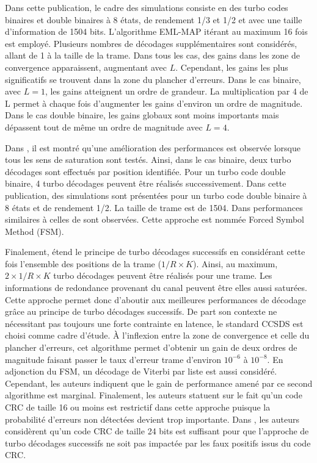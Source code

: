 Dans cette publication, le cadre des simulations consiste en des turbo codes binaires et double binaires à 8 états, de 
rendement 1/3 et 1/2 et avec une taille d'information de 1504 bits. L'algorithme EML-MAP itérant au maximum 16 fois est
employé. Plusieurs nombres de décodages supplémentaires sont considérés, allant de 1 à la taille de la trame. Dans tous 
les cas, des gains dans les zone de convergence apparaissent, augmentant avec $L$. Cependant, les gains les plus significatifs
se trouvent dans la zone du plancher d'erreurs. Dans le cas binaire, avec $L=1$, les gains atteignent un ordre de grandeur. 
La multiplication par 4 de L permet à chaque fois d'augmenter les gains d'environ un ordre de magnitude.\\
Dans le cas double binaire, les gains globaux sont moins importants mais dépassent tout de même un ordre de magnitude 
avec $L=4$. 

Dans \cite{fsm}, il est montré qu'une amélioration des performances est observée lorsque tous les sens de 
saturation sont testés. Ainsi, dans le cas binaire, deux turbo décodages sont effectués par position identifiée. Pour 
un turbo code double binaire, 4 turbo décodages peuvent être réalisés successivement. Dans cette publication, des 
simulations sont présentées pour un turbo code double binaire à 8 états et de rendement 1/2. La taille de trame est 
de 1504. Dans performances similaires à celles de \cite{cim} sont observées. Cette approche est nommée
Forced Symbol Method (FSM).

Finalement, \cite{pflet} étend le principe de turbo décodages successifs en considérant cette fois l'ensemble des positions de la trame ($1/R\times K$). 
Ainsi, au maximum, $2\times 1/R\times K$ turbo décodages peuvent être réalisés pour une trame. Les informations
de redondance provenant du canal peuvent être elles aussi saturées. Cette approche permet donc d'aboutir aux meilleures
performances de décodage grâce au principe de turbo décodages successifs. De part son contexte ne nécessitant pas toujours 
une forte contrainte en latence, le standard CCSDS est choisi comme cadre d'étude. À l'inflexion entre la zone de convergence 
et celle du plancher d'erreurs, cet algorithme permet d'obtenir un 
gain de deux ordres de magnitude faisant passer le taux d'erreur trame d'environ $10^{-6}$ à $10^{-8}$. En adjonction du 
FSM, un décodage de Viterbi par liste est aussi considéré. Cependant, les auteurs indiquent que 
le gain de performance amené par ce second algorithme est marginal. Finalement, les auteurs statuent sur 
le fait qu'un code CRC de taille 16 ou moins est restrictif dans cette approche puisque la probabilité d'erreurs non 
détectées devient trop importante. Dans \cite{fsm}, les auteurs considèrent qu'un code CRC de taille 24 bits est suffisant pour 
que l'approche de turbo décodages successifs ne soit pas impactée par les faux positifs issus du code CRC.

